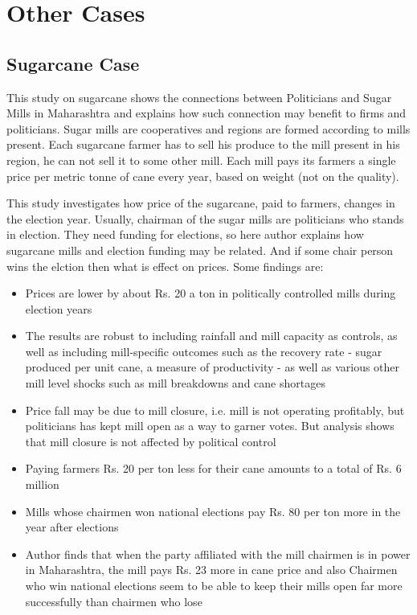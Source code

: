 \section{ Other Cases}

\subsection{Sugarcane Case}

This \cite{sugarcane} study on sugarcane shows the connections between Politicians and Sugar Mills in Maharashtra and explains how such connection may benefit to firms and politicians. Sugar mills are cooperatives and regions are formed according to mills present. Each sugarcane farmer has to sell his produce to the mill present in his region, he can not sell it to some other mill. Each mill pays its farmers a single price per metric tonne of cane every year, based on weight (not on the quality).

This study investigates how price of the sugarcane, paid to farmers, changes in the election year. Usually, chairman of the sugar mills are politicians who stands in election. They need funding for elections, so here author explains how sugarcane mills and election funding may be related. And if some chair person wins the elction then what is effect on prices. Some findings are:

\begin{itemize}

\item Prices are lower by about Rs. 20 a ton in politically controlled mills during election years

\item The results are robust to including rainfall and mill capacity as controls, as well as including mill-specific outcomes such as the recovery rate - sugar produced per unit cane, a measure of productivity - as well as various other mill level shocks such as mill breakdowns and cane shortages

\item Price fall may be due to mill closure, i.e. mill is not operating profitably, but politicians has kept mill open as a way to garner votes. But analysis shows that mill closure is not affected by political control

\item Paying farmers Rs. 20 per ton less for their cane amounts to a total of Rs. 6 million

\item Mills whose chairmen won national elections pay Rs. 80 per ton more in the year after elections

\item Author finds that when the party affiliated with the mill chairmen is in power in Maharashtra, the mill pays Rs. 23 more in cane price and also Chairmen who win national elections seem to be able to keep their mills open far more successfully than chairmen who lose

\end{itemize}

